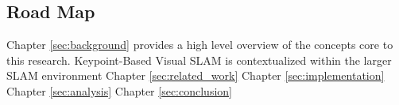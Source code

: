 \subsection{Road Map}

Chapter \ref{sec:background} provides a high level overview of the concepts core to this research. Keypoint-Based Visual SLAM is contextualized within the larger SLAM environment
Chapter \ref{sec:related_work}
Chapter \ref{sec:implementation}
Chapter \ref{sec:analysis}
Chapter \ref{sec:conclusion}